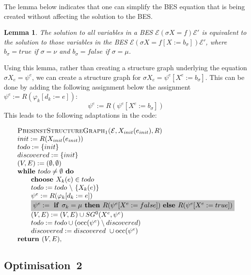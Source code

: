 \documentclass{article}
\newtheorem{lemma}[theorem]{Lemma}
\newcommand{\Space}{\text{\ }}
\newcommand{\If}{\text{\textbf{if }}}
\newcommand{\Do}{\text{\textbf{ do }}}
\newcommand{\Then}{\text{\textbf{ then }}}
\newcommand{\Else}{\text{\textbf{else }}}
\newcommand{\While}{\text{\textbf{while }}}
\newcommand{\Choose}{\text{\textbf{choose }}}
\newcommand{\Return}{\text{\textbf{return }}}
\begin{document}
The lemma below indicates that one can simplify the BES equation that is being created
without affecting the solution to the BES. 
\begin{lemma}
The solution to all variables in a BES $\mathcal{E} (\sigma X = f) \mathcal{E}'$ is 
equivalent to the solution to those variables in the BES
$\mathcal{E} (\sigma X = f[X := b_\sigma]) \mathcal{E}'$, where
$b_\sigma = true$ if $\sigma = \nu$ and $b_\sigma = false$ if $\sigma = \mu$.
\end{lemma}
Using this lemma, rather than creating a structure graph underlying the
equation $\sigma X_e = \psi^e$, we can create a structure graph
for $\sigma X_e = \psi^e[X^e := b_\sigma]$.
This can be done by adding the following assignment below the assignment
$\psi^e := R(\varphi_k[d_k := e])$:
\[
\psi^e := R(\psi^e[X^e := b_\sigma])
\]
This leads to the following adaptations in the code:

\begin{equation*}
\begin{array}{l}
\textsc{PbesinstStructureGraph$_1$(}\mathcal{E}, X_{init}(e_{init}), R) \\ 
init:=R(X_{init}(e_{init})) \\
todo:=\{init\} \\
discovered:=\{init\} \\
(V,E) :=(\emptyset ,\emptyset ) \\ 
\While todo\neq \emptyset \Do \\ 
\qquad \Choose X_{k}(e)\in todo \\ 
\qquad todo:=todo\ \backslash \ \{X_{k}(e)\} \\
\qquad \psi ^{e}:=R(\varphi _{k}[d_{k}:=e]) \\ 
\qquad \colorbox{lightgray}{$%
\psi^e := \Space \If \sigma_k = \mu \Then R(\psi^e[X^e := false]) \Space \Else  R(\psi^e[X^e := true]) $}\\
\qquad (V,E) := (V,E) \cup SG^{0}(X^{e},\psi ^{e}) \\ 
\qquad todo:=todo\cup (\mathrm{occ}(\psi ^{e})\setminus discovered) \\
\qquad discovered:=discovered\ \cup \mathrm{occ}(\psi ^{e}) \\
\Return (V, E),%
\end{array}%
\end{equation*}%


\subsection{Optimisation~2}
\end{document}
